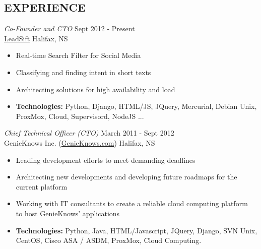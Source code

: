 \documentclass[line,margin]{res}
\begin{document}
\begin{resume}
\section{EXPERIENCE}

    {\sl Co-Founder and CTO} \hfill Sept 2012 - Present \\
    \href{http://www.leadsift.com}{LeadSift} \hfill Halifax, NS \smallskip
    \begin{itemize}  \itemsep -2pt %
     \item Real-time Search Filter for Social Media
     \item Classifying and finding intent in short texts
     \item Architecting solutions for high availability and load 
     \item {\bf Technologies:} \hspace{1pt}
        Python, Django, HTML/JS, JQuery, Mercurial, Debian \newline
        \hspace*{72pt} Unix, ProxMox, Cloud, Supervisord, NodeJS ...
    \end{itemize}

    {\sl Chief Technical Officer (CTO)} \hfill March 2011 - Sept 2012 \\
    GenieKnows Inc. (\href{http://www.genieknows.com}{GenieKnows.com}) \hfill Halifax, NS \smallskip
    \begin{itemize}  \itemsep -2pt %
     \item Leading development efforts to meet demanding deadlines
     \item Architecting new developments and developing future roadmaps for the \\
     current platform
     \item Working with IT consultants to create a reliable cloud computing platform \\ to host GenieKnows' applications 
     \item {\bf Technologies:} \hspace{1pt}
        Python, Java, HTML/Javascript, JQuery, Django, SVN \newline
        \hspace*{72pt} Unix, CentOS, Cisco ASA / ASDM, ProxMox, Cloud Computing.
    \end{itemize}


\end{resume}
\end{document}
